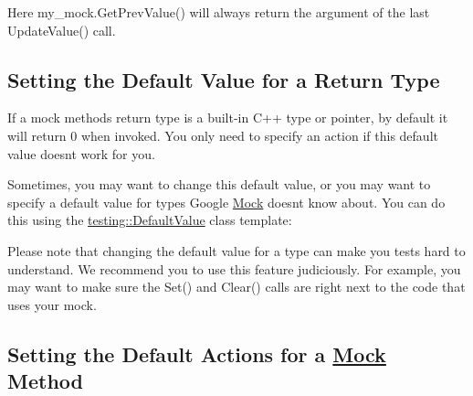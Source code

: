 Here {\ttfamily my\+\_\+mock.\+Get\+Prev\+Value()} will always return the argument of the last {\ttfamily Update\+Value()} call.

\subsection*{Setting the Default Value for a Return Type}

If a mock method\textquotesingle{}s return type is a built-\/in C++ type or pointer, by default it will return 0 when invoked. You only need to specify an action if this default value doesn\textquotesingle{}t work for you.

Sometimes, you may want to change this default value, or you may want to specify a default value for types Google \mbox{\hyperlink{class_mock}{Mock}} doesn\textquotesingle{}t know about. You can do this using the {\ttfamily \mbox{\hyperlink{classtesting_1_1_default_value}{testing\+::\+Default\+Value}}} class template\+:


\begin{DoxyCode}{0}
\DoxyCodeLine{\};}
\DoxyCodeLine{}
\DoxyCodeLine{}
\DoxyCodeLine{}
\DoxyCodeLine{}
\DoxyCodeLine{}
\end{DoxyCode}


Please note that changing the default value for a type can make you tests hard to understand. We recommend you to use this feature judiciously. For example, you may want to make sure the {\ttfamily Set()} and {\ttfamily Clear()} calls are right next to the code that uses your mock.

\subsection*{Setting the Default Actions for a \mbox{\hyperlink{class_mock}{Mock}} Method}


